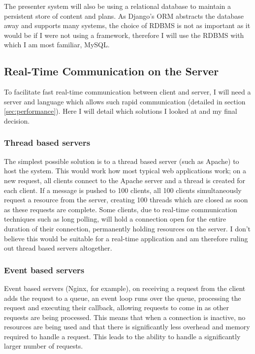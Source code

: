 \documentclass[a4papert,11pt,notitlepage]{ltxdoc}
\begin{document}
The presenter system will also be using a relational database to maintain a persistent store of content and plans. As Django's ORM abstracts the database away and supports many systems, the choice of RDBMS is not as important as it would be if I were not using a framework, therefore I will use the RDBMS with which I am most familiar, MySQL.

\subsection{Real-Time Communication on the Server}
To facilitate fast real-time communication between client and server, I will need a server and language which allows such rapid communication (detailed in section \ref{sec:performance}). Here I will detail which solutions I looked at and my final decision.

\subsubsection{Thread based servers}
The simplest possible solution is to a thread based server (such as Apache) to host the system. This would work how most typical web applications work; on a new request, all clients connect to the Apache server and a thread is created for each client. If a message is pushed to 100 clients, all 100 clients simultaneously request a resource from the server, creating 100 threads which are closed as soon as these requests are complete\cite{nginxapache:web}. Some clients, due to real-time communication techniques such as long polling, will hold a connection open for the entire duration of their connection, permanently holding resources on the server. I don't believe this would be suitable for a real-time application and am therefore ruling out thread based servers altogether.

\subsubsection{Event based servers}
Event based servers (Nginx, for example), on receiving a request from the client adds the request to a queue, an event loop runs over the queue, processing the request and executing their callback, allowing requests to come in as other requests are being processed. This means that when a connection is inactive, no resources are being used and that there is significantly less overhead and memory required to handle a request. This leads to the ability to handle a significantly larger number of requests.
\end{document}
